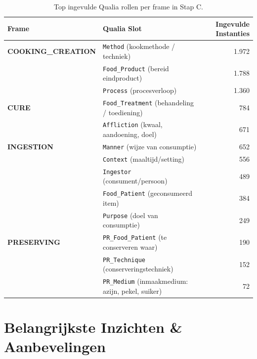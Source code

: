\documentclass[a4paper,11pt]{article}
\begin{document}
\begin{table}[h!]
\centering
\begin{tabular}{llr}
\toprule
\textbf{Frame} & \textbf{Qualia Slot} & \textbf{Ingevulde Instanties} \\
\midrule
\textbf{COOKING\_CREATION} & \texttt{Method} (kookmethode / techniek) & 1.972 \\
& \texttt{Food\_Product} (bereid eindproduct) & 1.788 \\
& \texttt{Process} (procesverloop) & 1.360 \\
\midrule
\textbf{CURE} & \texttt{Food\_Treatment} (behandeling / toediening) & 784 \\
& \texttt{Affliction} (kwaal, aandoening, doel) & 671 \\
\midrule
\textbf{INGESTION} & \texttt{Manner} (wijze van consumptie) & 652 \\
& \texttt{Context} (maaltijd/setting) & 556 \\
& \texttt{Ingestor} (consument/persoon) & 489 \\
& \texttt{Food\_Patient} (geconsumeerd item) & 384 \\
& \texttt{Purpose} (doel van consumptie) & 249 \\
\midrule
\textbf{PRESERVING} & \texttt{PR\_Food\_Patient} (te conserveren waar) & 190 \\
& \texttt{PR\_Technique} (conserveringstechniek) & 152 \\
& \texttt{PR\_Medium} (inmaakmedium: azijn, pekel, suiker) & 72 \\
\bottomrule
\end{tabular}
\caption{Top ingevulde Qualia rollen per frame in Stap C.}
\end{table}

\section{Belangrijkste Inzichten \& Aanbevelingen}
\end{document}
